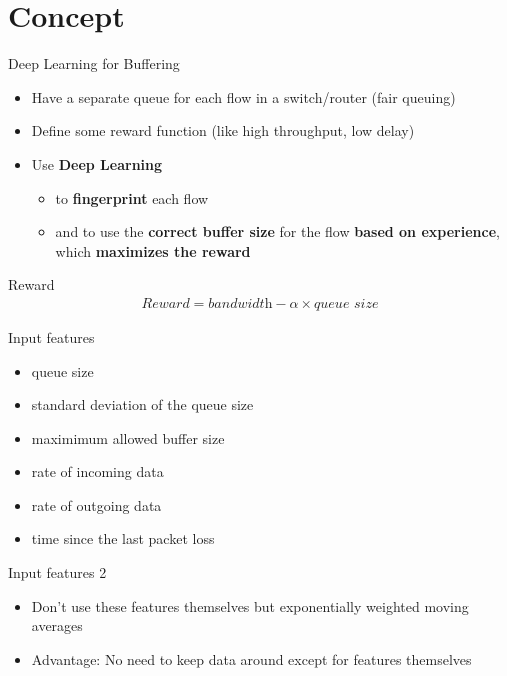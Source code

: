 \documentclass[xcolor={dvipsnames}]{beamer}
\begin{document}
\section{Concept}

\begin{frame}{Deep Learning for Buffering}
\begin{itemize}
\item Have a separate queue for each flow in a switch/router (fair queuing)
\item Define some reward function (like high throughput, low delay)
\item Use \textbf{Deep Learning}
\begin{itemize} \item to \textbf{fingerprint} each flow
\item and to use the \textbf{correct buffer size} for the flow \textbf{based on experience}, which \textbf{maximizes the reward}
\end{itemize}
\end{itemize}
\end{frame}

\begin{frame}{Reward}
\begin{align*}
\textit{Reward} = \textit{bandwidth}-\alpha\times\textit{queue size}
\end{align*}
\end{frame}

\begin{frame}{Input features}
\begin{itemize}
\item queue size
\item standard deviation of the queue size 
\item maximimum allowed buffer size
\item rate of incoming data
\item rate of outgoing data
\item time since the last packet loss
\end{itemize}
\end{frame}

\begin{frame}{Input features 2}
\begin{itemize}
\item Don't use these features themselves but exponentially weighted moving averages
\item Advantage: No need to keep data around except for features themselves
\end{itemize}
\end{frame}
\end{document}
